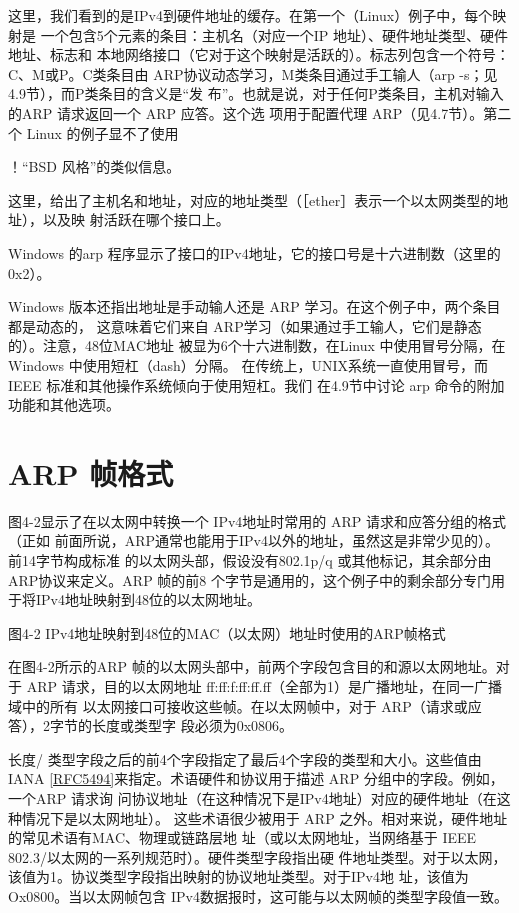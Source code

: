 这里，我们看到的是IPv4到硬件地址的缓存。在第一个（Linux）例子中，每个映射是
一个包含5个元素的条目：主机名（对应一个IP 地址）、硬件地址类型、硬件地址、标志和
本地网络接口（它对于这个映射是活跃的）。标志列包含一个符号：C、M或P。C类条目由
ARP协议动态学习，M类条目通过手工输人（arp -s；见4.9节），而P类条目的含义是“发
布”。也就是说，对于任何P类条目，主机对输入的ARP 请求返回一个 ARP 应答。这个选
项用于配置代理 ARP（见4.7节）。第二个 Linux 的例子显不了使用

！“BSD 风格”的类似信息。

这里，给出了主机名和地址，对应的地址类型（［ether］表示一个以太网类型的地址），以及映
射活跃在哪个接口上。

Windows 的arp 程序显示了接口的IPv4地址，它的接口号是十六进制数（这里的0x2）。

Windows 版本还指出地址是手动输人还是 ARP 学习。在这个例子中，两个条目都是动态的，
这意味着它们来自 ARP学习（如果通过手工输人，它们是静态的）。注意，48位MAC地址
被显为6个十六进制数，在Linux 中使用冒号分隔，在Windows 中使用短杠（dash）分隔。
在传统上，UNIX系统一直使用冒号，而IEEE 标准和其他操作系统倾向于使用短杠。我们
在4.9节中讨论 arp 命令的附加功能和其他选项。

\section{ARP 帧格式}

图4-2显示了在以太网中转换一个 IPv4地址时常用的 ARP 请求和应答分组的格式（正如
前面所说，ARP通常也能用于IPv4以外的地址，虽然这是非常少见的）。前14字节构成标准
的以太网头部，假设没有802.1p/q 或其他标记，其余部分由 ARP协议来定义。ARP 帧的前8
个字节是通用的，这个例子中的剩余部分专门用于将IPv4地址映射到48位的以太网地址。

图4-2 IPv4地址映射到48位的MAC（以太网）地址时使用的ARP帧格式

在图4-2所示的ARP 帧的以太网头部中，前两个字段包含目的和源以太网地址。对于
ARP 请求，目的以太网地址 ff:ff:f:ff:ff.ff（全部为1）是广播地址，在同一广播域中的所有
以太网接口可接收这些帧。在以太网帧中，对于 ARP（请求或应答），2字节的长度或类型字
段必须为0x0806。

长度/ 类型字段之后的前4个字段指定了最后4个字段的类型和大小。这些值由IANA
\href{https://www.rfc-editor.org/rfc/rfc5494}{[RFC5494]}来指定。术语硬件和协议用于描述 ARP 分组中的字段。例如，一个ARP 请求询
问协议地址（在这种情况下是IPv4地址）对应的硬件地址（在这种情况下是以太网地址）。
这些术语很少被用于 ARP 之外。相对来说，硬件地址的常见术语有MAC、物理或链路层地
址（或以太网地址，当网络基于 IEEE 802.3/以太网的一系列规范时）。硬件类型字段指出硬
件地址类型。对于以太网，该值为1。协议类型字段指出映射的协议地址类型。对于IPv4地
址，该值为Ox0800。当以太网帧包含 IPv4数据报时，这可能与以太网帧的类型字段值一致。

